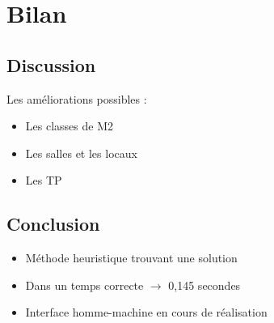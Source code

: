 \documentclass{beamer}
\begin{document}
\section{Bilan}
\subsection{Discussion}
\begin{frame}
Les améliorations possibles : 
\begin{itemize}
\item Les classes de M2
\item Les salles et les locaux
\item Les TP
\end{itemize}
\end{frame}

\subsection{Conclusion}
\begin{frame}
\begin{itemize}
\item Méthode heuristique trouvant une solution\\
\item Dans un temps correcte $\rightarrow$ 0,145 secondes\\
\item Interface homme-machine en cours de réalisation
\end{itemize}
\end{frame}
\end{document}
